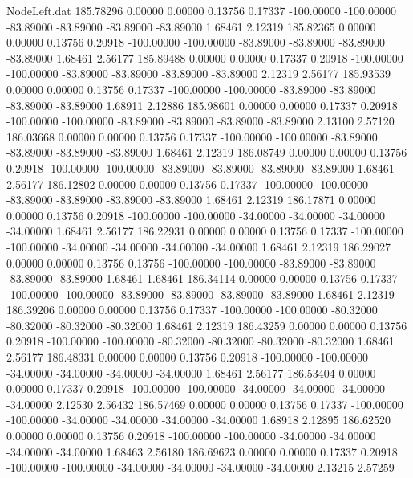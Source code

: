 \begin{filecontents}{NodeLeft.dat}
 185.78296    0.00000    0.00000     0.13756    0.17337 -100.00000 -100.00000  -83.89000  -83.89000  -83.89000  -83.89000    1.68461    2.12319
 185.82365    0.00000    0.00000     0.13756    0.20918 -100.00000 -100.00000  -83.89000  -83.89000  -83.89000  -83.89000    1.68461    2.56177
 185.89488    0.00000    0.00000     0.17337    0.20918 -100.00000 -100.00000  -83.89000  -83.89000  -83.89000  -83.89000    2.12319    2.56177
 185.93539    0.00000    0.00000     0.13756    0.17337 -100.00000 -100.00000  -83.89000  -83.89000  -83.89000  -83.89000    1.68911    2.12886
 185.98601    0.00000    0.00000     0.17337    0.20918 -100.00000 -100.00000  -83.89000  -83.89000  -83.89000  -83.89000    2.13100    2.57120
 186.03668    0.00000    0.00000     0.13756    0.17337 -100.00000 -100.00000  -83.89000  -83.89000  -83.89000  -83.89000    1.68461    2.12319
 186.08749    0.00000    0.00000     0.13756    0.20918 -100.00000 -100.00000  -83.89000  -83.89000  -83.89000  -83.89000    1.68461    2.56177
 186.12802    0.00000    0.00000     0.13756    0.17337 -100.00000 -100.00000  -83.89000  -83.89000  -83.89000  -83.89000    1.68461    2.12319
 186.17871    0.00000    0.00000     0.13756    0.20918 -100.00000 -100.00000  -34.00000  -34.00000  -34.00000  -34.00000    1.68461    2.56177
 186.22931    0.00000    0.00000     0.13756    0.17337 -100.00000 -100.00000  -34.00000  -34.00000  -34.00000  -34.00000    1.68461    2.12319
 186.29027    0.00000    0.00000     0.13756    0.13756 -100.00000 -100.00000  -83.89000  -83.89000  -83.89000  -83.89000    1.68461    1.68461
 186.34114    0.00000    0.00000     0.13756    0.17337 -100.00000 -100.00000  -83.89000  -83.89000  -83.89000  -83.89000    1.68461    2.12319
 186.39206    0.00000    0.00000     0.13756    0.17337 -100.00000 -100.00000  -80.32000  -80.32000  -80.32000  -80.32000    1.68461    2.12319
 186.43259    0.00000    0.00000     0.13756    0.20918 -100.00000 -100.00000  -80.32000  -80.32000  -80.32000  -80.32000    1.68461    2.56177
 186.48331    0.00000    0.00000     0.13756    0.20918 -100.00000 -100.00000  -34.00000  -34.00000  -34.00000  -34.00000    1.68461    2.56177
 186.53404    0.00000    0.00000     0.17337    0.20918 -100.00000 -100.00000  -34.00000  -34.00000  -34.00000  -34.00000    2.12530    2.56432
 186.57469    0.00000    0.00000     0.13756    0.17337 -100.00000 -100.00000  -34.00000  -34.00000  -34.00000  -34.00000    1.68918    2.12895
 186.62520    0.00000    0.00000     0.13756    0.20918 -100.00000 -100.00000  -34.00000  -34.00000  -34.00000  -34.00000    1.68463    2.56180
 186.69623    0.00000    0.00000     0.17337    0.20918 -100.00000 -100.00000  -34.00000  -34.00000  -34.00000  -34.00000    2.13215    2.57259

\end{filecontents}
